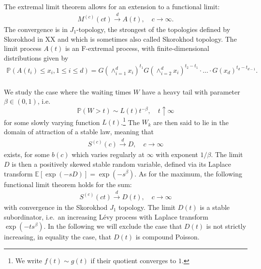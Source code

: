 \documentclass[12pt, a4paper]{article}
\newcommand{\PP}{\mathbb{P}}
\newcommand{\E}{\mathbb{E}}
\newcommand{\1}{\mathbf 1}
\begin{document}
\paragraph{}
The extremal limit theorem allows for an extension to a functional
limit: 
\begin{align} \label{eq:extremal-limit}
M^{(c)}(ct)
\stackrel{d}{\to} A(t),
\quad c \to \infty.
\end{align}
The convergence is in $J_1$-topology, the strongest of the topologies defined by Skorokhod in XX and which is sometimes also called Skorokhod topology. The limit process $A(t)$ is an F-extremal process, with finite-dimensional distributions given by
\begin{align*}
\PP(A(t_i)\leq x_i,1\leq i \leq d) = G(\wedge_{i=1}^d x_i)^{t_1}  G(\wedge_{i=2}^d x_i)^{t_2-t_1} \cdot \ldots \cdot G(x_d)^{t_d-t_{d-1}}.
\end{align*}

\paragraph{}
We study the case where the waiting times $W$ have a heavy tail with
parameter $\beta \in (0,1)$, i.e.\ 
$$
\PP(W > t) \sim L(t) t^{-\beta}, \quad t \uparrow \infty
$$ 
for some slowly varying function $L(t)$.\footnote{
We write $f(t) \sim g(t)$ if their quotient converges to $1$.
}
The $W_k$ are then said to lie in the 
domain of attraction of a stable law, meaning that 
\begin{align}\label{eq:sclt}
S^{(c)}(c) \overset{d}{\longrightarrow} D, 
\quad c \to \infty
\end{align}
exists, for some $b(c)$ which varies regularly at $\infty$ with exponent 
$1/\beta$. 
The limit $D$ is then a positively skewed stable random variable, defined via
its Laplace transform $\E[\exp(-sD)] = \exp(-s^\beta)$.
As for the maximum, the following functional limit theorem holds for the sum:
\begin{align}
S^{(c)}(ct) \overset{d}{\longrightarrow} D(t), 
\quad c \to \infty
\end{align}
with convergence in the Skorokhod $J_1$ topology.
The limit $D(t)$ is a stable subordinator, i.e.\ an increasing
L\'evy process with Laplace transform $\exp(-t s^\beta)$. In the following we will exclude the case that $D(t)$ is not strictly increasing, in equality the case, that $D(t)$ is compound Poisson. 
\end{document}
